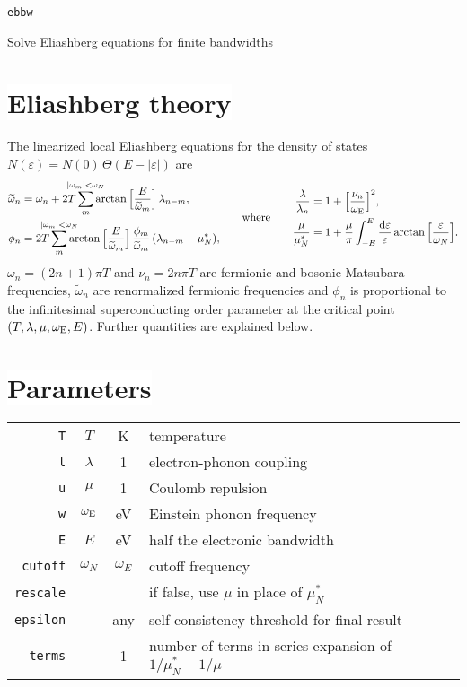 \documentclass[a4paper]{article}
\def\D{\mathrm d}
\def\sub#1{\sb{\mathrm{#1}}}
\def\limit#1{\sp{\mathclap{#1}}}
\let\tilde\widetilde
\let\epsilon\varepsilon
\let\Theta\varTheta
\def\headline#1{\section*{\normalsize\normalfont%
   \rlap{\rule[0.5ex]{\textwidth}{0.4pt}}\qquad\colorbox{white}{#1}}}
\begin{document}
   \begin{center}
      \LARGE \texttt{ebbw} \par \bigskip
      \large Solve Eliashberg equations for finite bandwidths
   \end{center}

   \headline{Eliashberg theory}

   The linearized local Eliashberg equations for the density of states
   $N(\epsilon) = N(0) \, \Theta(E - |\epsilon|)$ are
   \begin{align*}
      \begin{aligned}
         \tilde \omega_n &= \omega_n + 2 T \sum_m \limit{|\omega_m| < \omega_N}
         \arctan \Big[ \frac E {\tilde \omega_m} \Big] \, \lambda_{n - m},
         \\
         \phi_n &= 2 T \sum_m \limit{|\omega_m| < \omega_N}
         \arctan \Big[ \frac E {\tilde \omega_m} \Big] \,
         \frac{\phi_m}{\tilde \omega_m} \, (\lambda_{n - m} - \mu^*_N),
      \end{aligned}
      \qquad \text{where} \qquad
      \begin{aligned}
         \frac \lambda {\lambda_n} &=
         1 + \Big[ \frac{\nu_n}{\omega \sub E} \Big]^2,
         \\
         \frac \mu {\mu^*_N} &=
         1 + \frac \mu \pi \int_{-E}^E \frac {\D \epsilon} \epsilon
         \arctan \Big[ \frac \epsilon {\omega_N} \Big].
      \end{aligned}
   \end{align*}
   $\omega_n = (2 n + 1) \pi T$ and $\nu_n = 2 n \pi T$ are fermionic and
   bosonic Matsubara frequencies, $\tilde \omega_n$ are renormalized fermionic
   frequencies and $\phi_n$ is proportional to the infinitesimal superconducting
   order parameter at the critical point $(T, \lambda, \mu, \omega \sub E, E)$.
   Further quantities are explained below.

   \headline{Parameters}

   \begin{center}
      \begin{tabular}{r c c l}
         \verb|T| & $T$ & K & temperature \\
         \verb|l| & $\lambda$ & 1 & electron-phonon coupling \\
         \verb|u| & $\mu$ & 1 & Coulomb repulsion \\
         \verb|w| & $\omega \sub E$ & eV & Einstein phonon frequency \\
         \verb|E| & $E$ & eV & half the electronic bandwidth \\
         [2mm]
         \verb|cutoff| & $\omega_N$ & $\omega_E$ & cutoff frequency \\
         \verb|rescale| & & & if false, use $\mu$ in place of $\mu^*_N$ \\
         \verb|epsilon| & & any & self-consistency threshold for final result \\
         \verb|terms| & & 1 & number of terms in series expansion of
         $1 / \mu^*_N - 1 / \mu$
      \end{tabular}
   \end{center}
\end{document}
